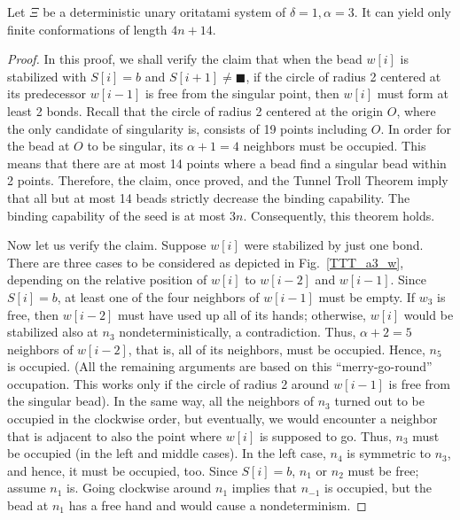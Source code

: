 

\begin{theorem}[$\delta = 1, \alpha = 3$]
Let $\Xi$ be a deterministic unary oritatami system of $\delta = 1, \alpha = 3$. It can yield only finite conformations of length $4n + 14$.
\end{theorem}



\begin{proof}
In this proof, we shall verify the claim that when the bead $w[i]$ is stabilized with $S[i] = b$ and $S[i+1] \neq \blacksquare$, if the circle of radius 2 centered at its predecessor $w[i-1]$ is free from the singular point, then $w[i]$ must form at least 2 bonds. 
Recall that the circle of radius 2 centered at the origin $O$, where the only candidate of singularity is, consists of 19 points including $O$. 
In order for the bead at $O$ to be singular, its $\alpha+1 = 4$ neighbors must be occupied. 
This means that there are at most 14 points where a bead find a singular bead within 2 points. 
Therefore, the claim, once proved, and the Tunnel Troll Theorem imply that all but at most 14 beads strictly decrease the binding capability. 
The binding capability of the seed is at most $3n$. 
Consequently, this theorem holds. 

Now let us verify the claim. 
Suppose $w[i]$ were stabilized by just one bond. 
There are three cases to be considered as depicted in Fig.~\ref{TTT_a3_w}, depending on the relative position of $w[i]$ to $w[i-2]$ and $w[i-1]$. 
Since $S[i] = b$, at least one of the four neighbors of $w[i-1]$ must be empty. 
If $w_3$ is free, then $w[i-2]$ must have used up all of its hands; otherwise, $w[i]$ would be stabilized also at $n_3$ nondeterministically, a contradiction. 
Thus, $\alpha + 2 = 5$ neighbors of $w[i-2]$, that is, all of its neighbors, must be occupied. 
Hence, $n_5$ is occupied. 
(All the remaining arguments are based on this ``merry-go-round'' occupation. This works only if the circle of radius 2 around $w[i-1]$ is free from the singular bead). 
In the same way, all the neighbors of $n_3$ turned out to be occupied in the clockwise order, but eventually, we would encounter a neighbor that is adjacent to also the point where $w[i]$ is supposed to go. 
Thus, $n_3$ must be occupied (in the left and middle cases). 
In the left case, $n_4$ is symmetric to $n_3$, and hence, it must be occupied, too. 
Since $S[i] = b$, $n_1$ or $n_2$ must be free; assume $n_1$ is. 
Going clockwise around $n_1$ implies that $n_{-1}$ is occupied, but the bead at $n_1$ has a free hand and would cause a nondeterminism. 


\end{proof}
